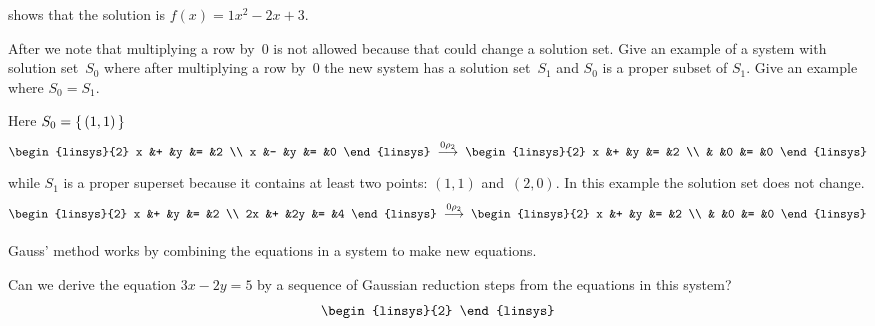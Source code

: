 \begin{exercises}
\begin{answer}
      shows that the solution is \( f(x)=1x^2-2x+3 \).  
      \end{answer}
  \item After  we note that multiplying a 
   row by~$0$ is not allowed because that could change a solution set. 
   Give an example of a system with solution set~$S_0$ where after 
   multiplying a row by~$0$ the new system has a solution set~$S_1$
   and $S_0$ is a proper subset of $S_1$.
   Give an example where $S_0=S_1$. 
   \begin{answer}
     Here $S_0=\mbox{$\{\,(1,1)\,\}$}$
     \begin{equation*}
         \begin{linsys}{2}
            x  &+  &y  &=  &2  \\
            x  &-  &y  &=  &0
          \end{linsys}               
         \;\grstep{0\rho_2}\;
         \begin{linsys}{2}
            x  &+  &y  &=  &2  \\
               &   &0  &=  &0
          \end{linsys}               
     \end{equation*}
     while $S_1$ is a proper superset because it
     contains at least two points: $(1,1)$ and~$(2,0)$.
     In this example the solution set does not change.  
     \begin{equation*}
         \begin{linsys}{2}
            x  &+  &y  &=  &2  \\
           2x  &+  &2y &=  &4
          \end{linsys}               
         \;\grstep{0\rho_2}\;
         \begin{linsys}{2}
            x  &+  &y  &=  &2  \\
               &   &0  &=  &0
          \end{linsys}               
     \end{equation*}
   \end{answer}
  \item 
    Gauss' method works by combining the equations in a system to make new
    equations.
    \begin{exparts}
      \partsitem Can we derive the equation \( 3x-2y=5 \) by a sequence of
        Gaussian reduction steps from the equations in this system?
        \begin{equation*}
          \begin{linsys}{2}

\end{linsys}
\end{equation*}
\end{exparts}
\end{exercises}
